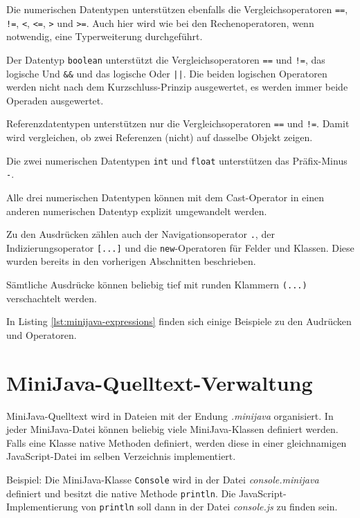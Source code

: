 Die numerischen Datentypen unterstützen ebenfalls die Vergleichsoperatoren \lstinline{==}, \lstinline{!=}, \lstinline{<}, \lstinline{<=}, \lstinline{>} und \lstinline{>=}. Auch hier wird wie bei den Rechenoperatoren, wenn notwendig, eine Typerweiterung durchgeführt.

Der Datentyp \lstinline{boolean} unterstützt die Vergleichsoperatoren \lstinline{==} und \lstinline{!=}, das logische Und \lstinline{&&} und das logische Oder \lstinline{||}. Die beiden logischen Operatoren werden nicht nach dem Kurzschluss-Prinzip ausgewertet, es werden immer beide Operaden ausgewertet.

Referenzdatentypen unterstützen nur die Vergleichsoperatoren \lstinline{==} und \lstinline{!=}. Damit wird vergleichen, ob zwei Referenzen (nicht) auf dasselbe Objekt zeigen.

Die zwei numerischen Datentypen \lstinline{int} und \lstinline{float} unterstützen das Präfix-Minus \lstinline{-}.

Alle drei numerischen Datentypen können mit dem Cast-Operator in einen anderen numerischen Datentyp explizit umgewandelt werden.

Zu den Ausdrücken zählen auch der Navigationsoperator \lstinline{.}, der Indizierungsoperator \lstinline{[...]} und die \lstinline{new}-Operatoren für Felder und Klassen. Diese wurden bereits in den vorherigen Abschnitten beschrieben.

Sämtliche Ausdrücke können beliebig tief mit runden Klammern \lstinline{(...)} verschachtelt werden.

In Listing \ref{lst:minijava-expressions} finden sich einige Beispiele zu den Audrücken und Operatoren.



\section{MiniJava-Quelltext-Verwaltung}

MiniJava-Quelltext wird in Dateien mit der Endung \emph{.minijava} organisiert. In jeder MiniJava-Datei können beliebig viele MiniJava-Klassen definiert werden. Falls eine Klasse native Methoden definiert, werden diese in einer gleichnamigen JavaScript-Datei im selben Verzeichnis implementiert.

Beispiel: Die MiniJava-Klasse \lstinline{Console} wird in der Datei \emph{console.minijava} definiert und besitzt die native Methode \lstinline{println}. Die JavaScript-Implementierung von \lstinline{println} soll dann in der Datei \emph{console.js} zu finden sein.


